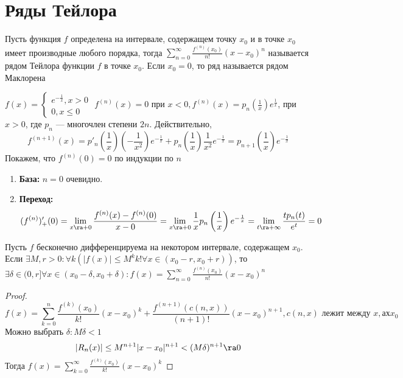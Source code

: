 \section{Ряды Тейлора}
\begin{definition}
    Пусть функция \(f\) определена на интервале, содержащем точку \(x_0\) и в точке \(x_0\) имеет производные любого порядка, тогда \(\sum_{n = 0}^\infty \frac{f^{(n)}(x_0)}{n!}(x - x_0)^n\) называется рядом Тейлора функции \(f\) в точке \(x_0\). Если \(x_0 = 0\), то ряд называется рядом Маклорена
\end{definition}
\begin{example}
    \(f(x) = \left\{\begin{array}{l}
        e^{-\frac{1}{x}}, x > 0 \\
        0, x \le 0
    \end{array}\right.\)
    \(f^{(n)}(x) = 0\) при \(x < 0, f^{(n)}(x) = p_n\left(\frac{1}{x}\right)e^\frac{1}{x}\), при \(x > 0\), где \(p_n\) --- многочлен степени \(2n\). Действительно,
    \[f^{(n + 1)}(x) = p'_{n}\left(\frac{1}{x}\right)\left(-\frac{1}{x^2}\right)e^{-\frac{1}{x}} + p_{n}\left(\frac{1}{x}\right)\frac{1}{x^2}e^{-\frac{1}{x}} = p_{n + 1}\left(\frac{1}{x}\right) e^{-\frac{1}{x}}\]
    Покажем, что \(f^{(n)}(0) = 0\) по индукции по \(n\)
    \begin{enumerate}
        \item[] \textbf{База:} \(n = 0\) очевидно.
        \item[] \textbf{Переход:} 
        \[(f^{(n)})_+'(0) = \lim_{x \ra +0} \frac{f^{(n)}(x) - f^{(n)}(0)}{x - 0} = \lim_{x \ra +0} \frac{1}{x}p_n\left(\frac{1}{x}\right)e^{-\frac{1}{x}} = \lim_{t \ra +\infty} \frac{tp_n(t)}{e^t} = 0\]
    \end{enumerate}
\end{example}

\begin{lemma}
    Пусть \(f\) бесконечно дифференцируема на некотором интервале, содержащем \(x_0\). Если \(\exists M, r > 0: \forall k (|f(x)| \le M^kk! \forall x \in (x_0 - r, x_0 + r))\), то \(\exists \delta \in (0, r] \forall x \in (x_0 - \delta, x_0 + \delta): f(x) = \sum_{n = 0}^\infty \frac{f^{(n)}(x_0)}{n!}(x - x_0)^n\)
\end{lemma}
\begin{proof}
    \[f(x) = \sum_{k = 0}^n \frac{f^{(k)}(x_0)}{k!}(x - x_0)^k + \frac{f^{(n + 1)}(c(n, x))}{(n + 1)!}(x - x_0)^{n + 1}, c(n, x) \text{ лежит между }x,ах x_0\]
    Можно выбрать \(\delta: M\delta < 1\)
    \[|R_n(x)| \le M^{n + 1}|x - x_0|^{n + 1} < (M\delta)^{n + 1} \ra 0\]
    Тогда \(f(x) = \sum_{k = 0}^\infty \frac{f^{(k)}(x_0)}{k!}(x - x_0)^k\)
\end{proof}